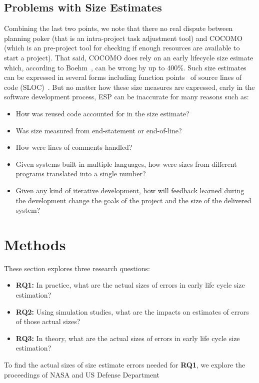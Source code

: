 \documentclass[final,twocolumn,5p]{elsarticle}
\newcommand{\bi}{\begin{itemize}[leftmargin=0.4cm]}
\newcommand{\ei}{\end{itemize}}
\theoremstyle{break}
\begin{document}
  \subsection{Problems with Size Estimates}
Combining the last two points, we note that there no real dispute between planning poker (that is an intra-project
task adjustment tool) and COCOMO (which is an pre-project tool for checking if enough resources are available
to start a project).
That said, COCOMO does rely on an early lifecycle size esimate which, according to Boehm~\cite{boehm81}, can be wrong
by up to 400\%.
Such size estimates can be expressed in several
forms including function points~\cite{Albrecht83} of  source lines of code (SLOC)~\cite{boehm81}.
But no matter how  these size measures are expressed, early in the software development process,
ESP can be inaccurate for many reasons such as:
\bi
\item How was reused code accounted for in the size estimate?
\item  Was size measured from end-statement or end-of-line?
\item How were lines of comments handled?
\item Given systems built in multiple languages, how were sizes from different programs translated
  into a single number?
\item
  Given any kind of iterative development, how will feedback learned during the development change
  the goals of the project and the size of the delivered system?
  \ei
  
 

\section{Methods}
These section explores three research questions:
\bi
\item[{\bf RQ1:}] In practice, what are the actual sizes of errors in early life cycle size estimation?
\item[{\bf RQ2:}] Using simulation studies, what are the impacts on estimates of errors of those actual sizes?
  \item[{\bf RQ3:}] In theory, what are the actual sizes of errors in early life cycle size estimation?
    \ei

    To find the actual sizes of size estimate errors needed for {\bf RQ1}, we explore the proceedings
    of NASA and US Defense Department 
\end{document}
